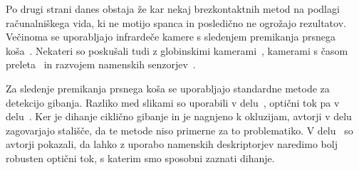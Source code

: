 Po drugi strani danes obstaja že kar nekaj brezkontaktnih metod na podlagi računalniškega vida, ki ne motijo spanca in posledično ne ogrožajo rezultatov. Večinoma se uporabljajo infrardeče kamere s sledenjem premikanja prsnega koša~\cite{sathyanarayana2015vision}. Nekateri so poskušali tudi z globinskimi kamerami~\cite{yang2014sleep}, kamerami s časom preleta~\cite{falie2009statistical} in razvojem namenskih senzorjev~\cite{takemura2005respiratory}.

Za sledenje premikanja prsnega koša se uporabljajo standardne metode za detekcijo gibanja. Razliko med slikami so uporabili v delu~\cite{nakai2000non}, optični tok pa v delu~\cite{nakajima2001development}. Ker je dihanje ciklično gibanje in je nagnjeno k okluzijam, avtorji v delu~\cite{wang2014unconstrained} zagovarjajo stališče, da te metode niso primerne za to problematiko. V delu~\cite{koporec2017observation} so avtorji pokazali, da lahko z uporabo namenskih deskriptorjev naredimo bolj robusten optični tok, s katerim smo sposobni zaznati dihanje.